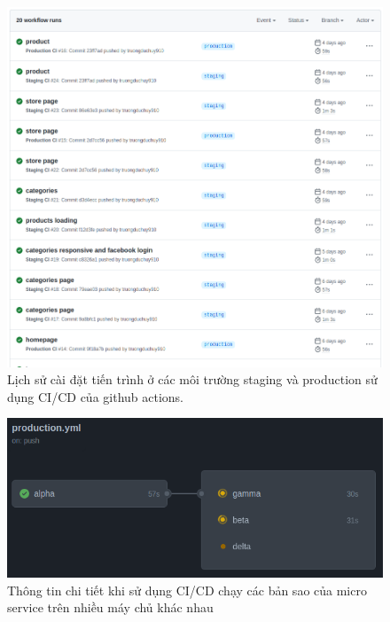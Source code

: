 \begin{figure}[h!]
	\begin{center}	
		\includegraphics[width=\textwidth]{./results/deployments}
		\caption{Lịch sử cài đặt tiến trình ở các môi trường staging và production sử dụng CI/CD của github actions.}
	\end{center}
	
\end{figure}

\begin{figure}[h!]
	\begin{center}	
		\includegraphics[width=\textwidth]{./results/jobs}
		\caption{Thông tin chi tiết khi sử dụng CI/CD chạy các bản sao của micro service trên nhiều máy chủ khác nhau}
	\end{center}
\end{figure}


